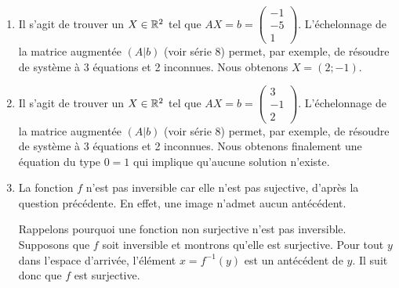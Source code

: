 {\begin{enumerate}
		Nous pouvons vérifier que $A\cdot \pvec12$ donne bien l'image calculée ci-dessus :
			\[  \begin{pmatrix} 1&3 \\ -2&1 \\ 1&1 \end{pmatrix} \cdot \pvec12 = \begin{pmatrix}7\\0\\3\end{pmatrix}. \]
		\item
		Il s'agit de trouver un $X\in\mathbb{R}^2$ tel que $AX = b = \begin{pmatrix}-1\\-5\\1\end{pmatrix}$.
		L'échelonnage de la matrice augmentée $(A|b)$ (voir série 8) permet, par exemple, de résoudre de système à 3 équations et 2 inconnues.
		Nous obtenons $X = (2;-1)$.
		\item
		Il s'agit de trouver un $X\in\mathbb{R}^2$ tel que $AX = b = \begin{pmatrix}3\\-1\\2\end{pmatrix}$.
		L'échelonnage de la matrice augmentée $(A|b)$ (voir série 8) permet, par exemple, de résoudre de système à 3 équations et 2 inconnues.
		Nous obtenons finalement une équation du type $0=1$ qui implique qu'aucune solution n'existe.
		\item
		La fonction $f$ n'est pas inversible car elle n'est pas sujective, d'après la question précédente.
		En effet, une image n'admet aucun antécédent.
		
		Rappelons pourquoi une fonction non surjective n'est pas inversible.
		Supposons que $f$ soit inversible et montrons qu'elle est surjective.
		Pour tout $y$ dans l'espace d'arrivée, l'élément $x = f^{-1}(y)$ est un antécédent de $y$.
		Il suit donc que $f$ est surjective.
	\end{enumerate}
}




